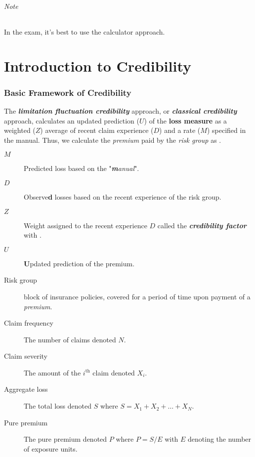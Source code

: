 \documentclass[english]{article}
\begin{document}
\begin{multicols*}{2}
\begin{definitionNOHFILL}[Mode]
\paragraph{Note}	In the exam, it's best to use the calculator approach.
\end{definitionNOHFILL}


\newpage
\part{Introduction to Credibility}\label{part:cred}
\section{Basic Framework of Credibility}\label{sec:credBasics}
\begin{rappel_enhanced}[Context]
The \textbf{\textit{limitation fluctuation credibility}} approach, or \textbf{\textit{classical credibility}} approach, calculates an updated prediction ($U$) of the \textbf{loss measure} as a weighted ($Z$) average of recent claim experience ($D$) and a rate ($M$) specified in the manual. Thus, we calculate the \textit{premium} paid by the \textit{risk group} as .
\end{rappel_enhanced}

\begin{distributions}[Notation]
\begin{description}
	\item[$M$]	Predicted loss based on the "\textit{\textbf{m}anual}".
	\item[$D$]	Observe\textbf{d} losses based on the recent experience of the risk group.
	\item[$Z$]	Weight assigned to the recent experience $D$ called the \textbf{\textit{credibility factor}} with . 
	\item[$U$]	\textbf{U}pdated prediction of the premium.
\end{description}
\end{distributions}

\begin{distributions}[Terminology]
\begin{description}
	\item[Risk group]	block of insurance policies, covered for a period of time upon payment of a \textit{premium}.
	\item[Claim frequency]	The number of claims denoted $N$.
	\item[Claim severity]	The amount of the $i^{\text{th}}$ claim denoted $X_{i}$.
	\item[Aggregate loss]	The total loss denoted $S$ where $S = X_{1} + X_{2} + \hdots + X_{N}$.
	\item[Pure premium]	The pure premium denoted $P$ where $P = S/E$ with $E$ denoting the number of exposure units.
\end{description}
\end{distributions}


\end{multicols*}
\end{document}
